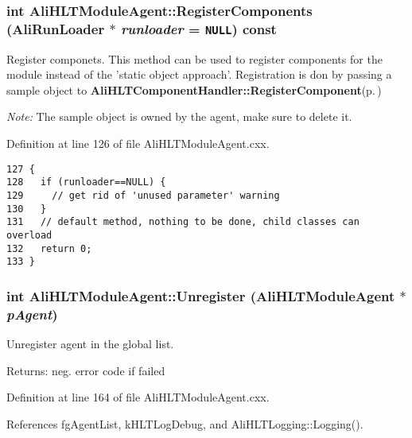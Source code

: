 \subsubsection{\setlength{\rightskip}{0pt plus 5cm}int Ali\-HLTModule\-Agent::Register\-Components (Ali\-Run\-Loader $\ast$ {\em runloader} = {\tt NULL}) const\hspace{0.3cm}{\tt  [virtual]}}\label{classAliHLTModuleAgent_a8}


Register componets. This method can be used to register components for the module instead of the 'static object approach'. Registration is don by passing a sample object to {\bf Ali\-HLTComponent\-Handler::Register\-Component}{\rm (p.\,\pageref{classAliHLTComponentHandler_a10})}\par
 {\em Note:\/} The sample object is owned by the agent, make sure to delete it. 

Definition at line 126 of file Ali\-HLTModule\-Agent.cxx.

\footnotesize\begin{verbatim}127 {
128   if (runloader==NULL) {
129     // get rid of 'unused parameter' warning
130   }
131   // default method, nothing to be done, child classes can overload
132   return 0;
133 }
\end{verbatim}\normalsize 


\subsubsection{\setlength{\rightskip}{0pt plus 5cm}int Ali\-HLTModule\-Agent::Unregister ({\bf Ali\-HLTModule\-Agent} $\ast$ {\em p\-Agent})\hspace{0.3cm}{\tt  [static, private]}}\label{classAliHLTModuleAgent_h1}


Unregister agent in the global list. \begin{Desc}
\item[Returns:]neg. error code if failed \end{Desc}


Definition at line 164 of file Ali\-HLTModule\-Agent.cxx.

References fg\-Agent\-List, k\-HLTLog\-Debug, and Ali\-HLTLogging::Logging().

